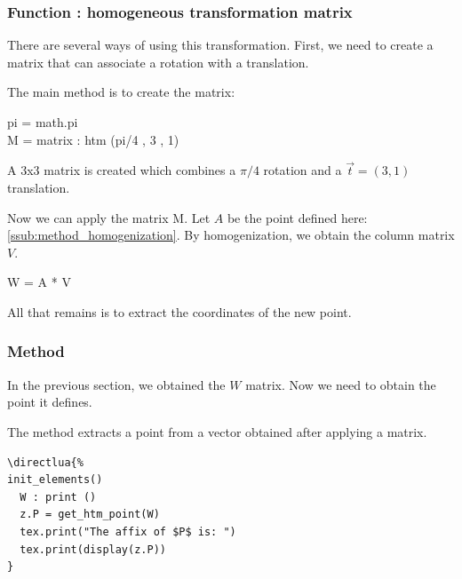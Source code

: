 \subsubsection{Function : homogeneous transformation matrix} %
\label{ssub:method_htm}

There are several ways of using this transformation. First, we need to create a matrix that can associate a rotation with a translation.

The main method is to create the matrix:

\begin{mybox}
  pi  = math.pi\\
  M   = matrix : htm (pi/4 , 3 , 1)
\end{mybox}

A 3x3 matrix is created which combines a $\pi/4$ rotation and a $\overrightarrow{t}=(3,1)$ translation.



Now we can apply the matrix M. Let $A$ be the point defined here: \ref{ssub:method_homogenization}. By homogenization, we obtain the column matrix $V$.


\begin{mybox}
W = A * V
\end{mybox}


All that remains is to extract the coordinates of the new point.

\subsubsection{Method } %
\label{ssub:method_code_get__htm__point}

In the previous section, we obtained the $W$ matrix. Now we need to obtain the point it defines. 

The  method   extracts a point from a vector obtained after applying a  matrix.

\begin{minipage}{.5\textwidth}
\begin{verbatim}
\directlua{%
init_elements()
  W : print ()
  z.P = get_htm_point(W)
  tex.print("The affix of $P$ is: ")
  tex.print(display(z.P))
}
\end{verbatim}
\end{minipage}
\begin{minipage}{.5\textwidth}
\end{minipage}


